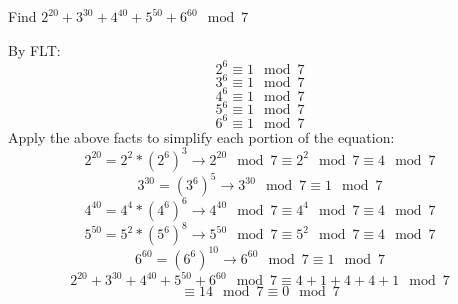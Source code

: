 \question Find $2^{20} + 3^{30} + 4^{40} + 5^{50} + 6^{60} \mod 7$
\begin{solution} [1 in]
By FLT:
\[2^6 \equiv 1 \mod 7\]
\[3^6 \equiv 1 \mod 7\]
\[4^6 \equiv 1 \mod 7\]
\[5^6 \equiv 1 \mod 7\]
\[6^6 \equiv 1 \mod 7 \]
Apply the above facts to simplify each portion of the equation:
\[2^{20} = 2^2 * (2^6)^3  \rightarrow 	2^{20} \mod 7 \equiv 2^2 
\mod 7 \equiv 4 \mod 7\]
\[3^{30} = (3^6)^5 \rightarrow 	3^{30} \mod 7 \equiv 1 \mod 7\]
\[4^{40} = 4^4 * (4^6)^6 	\rightarrow	4^{40} \mod 7 \equiv 4^4 
\mod 7  \equiv 4 \mod 7\]
\[5^{50} = 5^2 * (5^6)^8 	\rightarrow 	5^{50}  \mod 7 \equiv 5^2 
\mod 7 \equiv 4 \mod 7\]
\[6^{60} = (6^6)^{10}	\rightarrow 	6^{60} \mod 7 \equiv 1 \mod 7\]
\[2^{20} + 3^{30} + 4^{40} + 5^{50} + 6^{60} \mod 7 \equiv 4 + 1 + 4 + 
4 + 1 \mod 7\]
				  \[\equiv 14 \mod 7 \equiv  0 \mod 7\]
\end{solution}